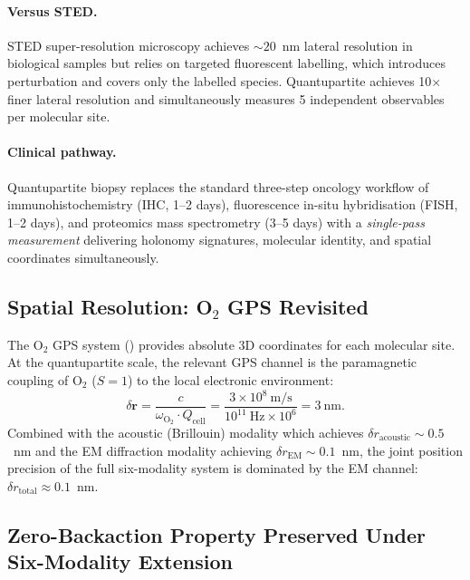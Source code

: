 \paragraph{Versus STED.}
STED super-resolution microscopy achieves $\sim 20$~nm lateral resolution
in biological samples but relies on targeted fluorescent labelling, which
introduces perturbation and covers only the labelled species.
Quantupartite achieves 10$\times$ finer lateral resolution and
simultaneously measures 5 independent observables per molecular site.

\paragraph{Clinical pathway.}
Quantupartite biopsy replaces the standard three-step oncology workflow of
immunohistochemistry (IHC, 1--2 days), fluorescence in-situ hybridisation
(FISH, 1--2 days), and proteomics mass spectrometry (3--5 days) with a
\emph{single-pass measurement} delivering holonomy signatures, molecular
identity, and spatial coordinates simultaneously.

\subsection{Spatial Resolution: O$_2$ GPS Revisited}

The O$_2$ GPS system () provides
absolute 3D coordinates for each molecular site.  At the quantupartite
scale, the relevant GPS channel is the paramagnetic coupling of O$_2$
($S = 1$) to the local electronic environment:
\begin{equation}
\label{eq:ch04-o2-gps-refined}
    \delta\mathbf{r}
        = \frac{c}{\omega_{\mathrm{O}_2} \cdot Q_{\mathrm{cell}}}
        = \frac{3\times10^8\ \mathrm{m/s}}
               {10^{11}\ \mathrm{Hz}\times 10^6}
        = 3\ \mathrm{nm}.
\end{equation}
Combined with the acoustic (Brillouin) modality which achieves
$\delta r_{\mathrm{acoustic}} \sim 0.5$~nm and the EM diffraction modality
achieving $\delta r_{\mathrm{EM}} \sim 0.1$~nm, the joint position
precision of the full six-modality system is dominated by the EM channel:
$\delta r_{\mathrm{total}} \approx 0.1$~nm.

\subsection{Zero-Backaction Property Preserved Under Six-Modality Extension}

